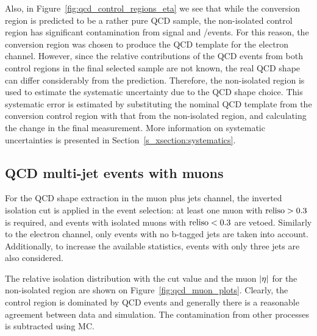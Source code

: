 Also, in Figure~\ref{fig:qcd_control_regions_eta} we see that while the conversion region is predicted to be a rather
pure QCD sample, the non-isolated control region has significant contamination from \ttbar signal and \W/\ZpJets events.
For this reason, the conversion region was chosen to produce the QCD template for the electron channel. However, since
the relative contributions of the QCD events from both control regions in the final selected sample are not known, the
real QCD shape can differ considerably from the prediction. Therefore, the non-isolated region is used to estimate the
systematic uncertainty due to the QCD shape choice. This systematic error is estimated by substituting the nominal QCD
template from the conversion control region with that from the non-isolated region, and calculating the change in the
final measurement. More information on systematic uncertainties is presented in Section~\ref{s_xsection:systematics}.

\subsection{QCD multi-jet events with muons}
For the QCD shape extraction in the muon plus jets channel, the inverted isolation cut is applied in the event
selection: at least one muon with $\textrm{reliso}>0.3$ is required, and events with isolated muons with $\textrm{reliso}<0.3$ are
vetoed. Similarly to the electron channel, only events with no b-tagged jets are taken into account. Additionally, to
increase the available statistics, events with only three jets are also considered. %

The relative isolation distribution with the cut value and the muon $\lvert \eta \rvert$ for the non-isolated region are shown on
Figure~\ref{fig:qcd_muon_plots}. Clearly, the control region is dominated by QCD events and generally there is a
reasonable agreement between data and simulation. The contamination from other processes is subtracted using MC.

